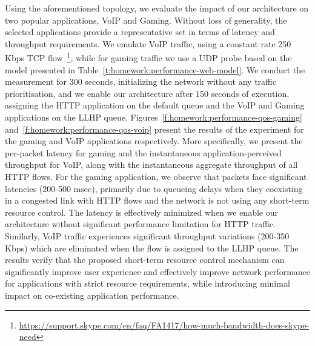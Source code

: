 Using the aforementioned topology, we evaluate the impact of our architecture
on two popular applications, VoIP and Gaming. Without loss of generality, the
selected applications provide a representative set in terms of  latency and
throughput requirements.  We emulate VoIP traffic, using a constant rate 250
Kbps TCP
flow~\footnote{\url{https://support.skype.com/en/faq/FA1417/how-much-bandwidth-does-skype-need}},
while for gaming traffic we use a UDP probe based on the model presented in
Table~\ref{t:homework:performance-web-model}. We conduct the measurement for
300 seconds, initializing the network without any traffic prioritisation, and
we enable our architecture after 150 seconds of execution, assigning the HTTP
application on the default queue and the VoIP and Gaming applications on the
LLHP queue. Figures~\ref{f:homework:performance-qos-gaming}
and~\ref{f:homework:performance-qos-voip} present the results of the experiment
for the gaming and VoIP applications respectively. More specifically, we
present the per-packet latency for gaming and the instantaneous
application-perceived throughput for VoIP, along with the instantaneous
aggregate throughput of all HTTP flows. For the gaming application, we observe
that packets face significant latencies (200-500 msec), primarily due to
queueing delays when they coexisting in a congested link with HTTP flows and
the network is not using any short-term resource control. The latency is
effectively minimized when we enable our architecture without significant
performance limitation for HTTP traffic. Similarly, VoIP traffic experiences
significant throughput variations (200-350 Kbps) which are eliminated when the
flow is assigned to the LLHP queue.  The results verify that the proposed
short-term resource control mechanism can significantly improve user
experience and effectively improve network performance for applications
with strict resource requirements, while introducing minimal impact on
co-existing application performance. 

